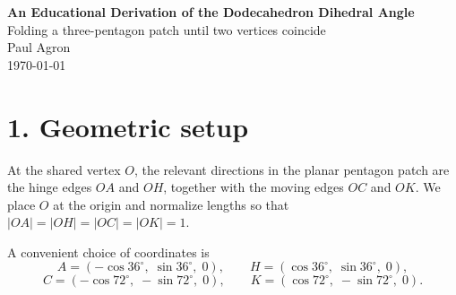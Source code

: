 \documentclass[11pt]{article}
\begin{document}
\begin{center}
    {\LARGE\bfseries An Educational Derivation of the Dodecahedron Dihedral Angle}\\[0.5em]
    {\large Folding a three-pentagon patch until two vertices coincide}\\[1em]
    {\large Paul Agron}\\[0.2em]
    {\large \today}\\[1em]
\end{center}

\noindent
{}

\vspace{1em}

\begin{abstract}
This note shows how a local patch of three regular pentagons already contains the dihedral angle of the regular dodecahedron. We first set up a coordinate model, then derive the exact fold angle using Rodrigues' rotation formula and a symmetry condition. We also give a numerical minimization viewpoint, which is often the most practical way to solve related folding problems computationally.
\end{abstract}

\section*{1. Geometric setup}
At the shared vertex \(O\), the relevant directions in the planar pentagon patch are the hinge edges \(OA\) and \(OH\), together with the moving edges \(OC\) and \(OK\). We place \(O\) at the origin and normalize lengths so that \(|OA|=|OH|=|OC|=|OK|=1\).

A convenient choice of coordinates is
\[
A=(-\cos 36^\circ,\; \sin 36^\circ,\; 0),
\qquad
H=(\cos 36^\circ,\; \sin 36^\circ,\; 0),
\]
\[
C=(-\cos 72^\circ,\; -\sin 72^\circ,\; 0),
\qquad
K=(\cos 72^\circ,\; -\sin 72^\circ,\; 0).
\]
\end{document}
